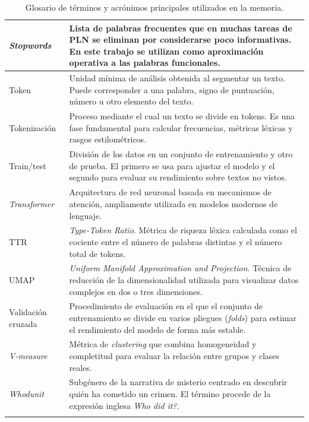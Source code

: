 \documentclass[IB]{TFUOC}%
\begin{document}
\begin{longtable}{|p{5.2cm}|p{10.5cm}|}
\textit{Stopwords} &
Lista de palabras frecuentes que en muchas tareas de PLN se eliminan por considerarse poco informativas. En este trabajo se utilizan como aproximación operativa a las palabras funcionales. \\
\hline

Token &
Unidad mínima de análisis obtenida al segmentar un texto. Puede corresponder a una palabra, signo de puntuación, número u otro elemento del texto. \\
\hline

Tokenización &
Proceso mediante el cual un texto se divide en tokens. Es una fase fundamental para calcular frecuencias, métricas léxicas y rasgos estilométricos. \\
\hline

Train/test &
División de los datos en un conjunto de entrenamiento y otro de prueba. El primero se usa para ajustar el modelo y el segundo para evaluar su rendimiento sobre textos no vistos. \\
\hline

\textit{Transformer} &
Arquitectura de red neuronal basada en mecanismos de atención, ampliamente utilizada en modelos modernos de lenguaje. \\
\hline

TTR &
\textit{Type-Token Ratio}. Métrica de riqueza léxica calculada como el cociente entre el número de palabras distintas y el número total de tokens. \\
\hline

UMAP &
\textit{Uniform Manifold Approximation and Projection}. Técnica de reducción de la dimensionalidad utilizada para visualizar datos complejos en dos o tres dimensiones. \\
\hline

Validación cruzada &
Procedimiento de evaluación en el que el conjunto de entrenamiento se divide en varios pliegues (\textit{folds}) para estimar el rendimiento del modelo de forma más estable. \\
\hline

\textit{V-measure} &
Métrica de \textit{clustering} que combina homogeneidad y completitud para evaluar la relación entre grupos y clases reales. \\
\hline

\textit{Whodunit} &
Subgénero de la narrativa de misterio centrado en descubrir quién ha cometido un crimen. El término procede de la expresión inglesa \textit{Who did it?}. \\
\hline

\caption{Glosario de términos y acrónimos principales utilizados en la memoria.}
\label{tab:glosario}
\end{longtable}
\end{document}
